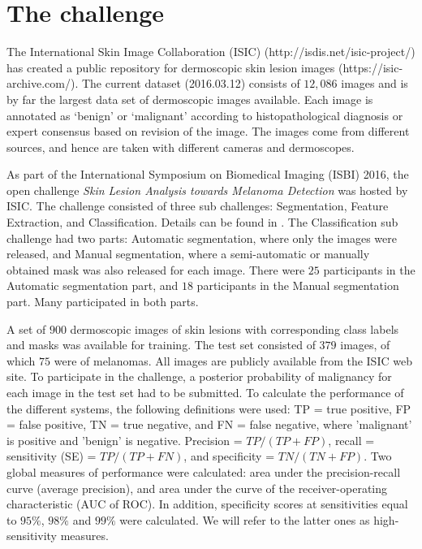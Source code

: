 \documentclass[10pt,letterpaper]{article}
\begin{document}
\section*{The challenge} \label{sec:Challenge}

The International Skin Image Collaboration (ISIC) (http://isdis.net/isic-project/) has created a public repository for dermoscopic skin lesion images (https://isic-archive.com/). 
The current dataset (2016.03.12) consists of $12,086$ images and is by far the largest data set of dermoscopic images available. 
Each image is annotated as `benign' or `malignant' according to histopathological diagnosis or expert consensus based on revision of the image. 
The images come from different sources, and hence are taken with different cameras and dermoscopes. 

As part of the International Symposium on Biomedical Imaging (ISBI) 2016, the open challenge {\it Skin Lesion Analysis towards Melanoma Detection} was hosted by ISIC. 
The challenge consisted of three sub challenges: Segmentation, Feature Extraction, and Classification. 
Details can be found in \cite{Gutman2016Skin}. 
The Classification sub challenge had two parts: Automatic segmentation, where only the images were released, and Manual segmentation, where a semi-automatic or manually obtained mask was also released for each image. 
There were $25$ participants in the Automatic segmentation part, and $18$ participants in the Manual segmentation part. 
Many participated in both parts. 

A set of $900$ dermoscopic images of skin lesions with corresponding class labels and masks was available for training. 
The test set consisted of $379$ images, of which $75$ were of melanomas. 
All images are publicly available from the ISIC web site. 
To participate in the challenge, a posterior probability of malignancy for each image in the test set had to be submitted. 
To calculate the performance of the different systems, the following definitions were used: TP = true positive, FP = false positive, TN = true negative, and FN = false negative, where 'malignant' is positive and 'benign' is negative. 
Precision = $TP/(TP+FP)$, recall = sensitivity (SE) = $TP/(TP+FN)$, and specificity = $TN/(TN+FP)$. 
Two global measures of performance were calculated: area under the precision-recall curve (average precision), and area under the curve of the receiver-operating characteristic (AUC of ROC). 
In addition, specificity scores at sensitivities equal to $95\%$, $98\%$ and $99\%$ were calculated. 
We will refer to the latter ones as high-sensitivity measures. 
\end{document}
